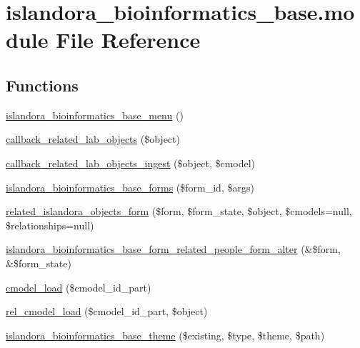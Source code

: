 \hypertarget{islandora__bioinformatics__base_8module}{\section{islandora\+\_\+bioinformatics\+\_\+base.\+module File Reference}
\label{islandora__bioinformatics__base_8module}
}
\subsection*{Functions}
\begin{DoxyCompactItemize}
\item 
\hyperlink{islandora__bioinformatics__base_8module_a34856467f23719cd8eaf851f85ccf7e8}{islandora\+\_\+bioinformatics\+\_\+base\+\_\+menu} ()
\item 
\hyperlink{islandora__bioinformatics__base_8module_a68c82f4c7760c83fb600e25c7d5a23a3}{callback\+\_\+related\+\_\+lab\+\_\+objects} (\$object)
\item 
\hyperlink{islandora__bioinformatics__base_8module_a6c31991c3bd91b6c9c008c69b8fe7f87}{callback\+\_\+related\+\_\+lab\+\_\+objects\+\_\+ingest} (\$object, \$cmodel)
\item 
\hyperlink{islandora__bioinformatics__base_8module_a2e95f32f792ce2fcd79c32895fcdbe43}{islandora\+\_\+bioinformatics\+\_\+base\+\_\+forms} (\$form\+\_\+id, \$args)
\item 
\hyperlink{islandora__bioinformatics__base_8module_a746c0835872899ef0101a8a047c8c505}{related\+\_\+islandora\+\_\+objects\+\_\+form} (\$form, \$form\+\_\+state, \$object, \$cmodels=null, \$relationships=null)
\item 
\hyperlink{islandora__bioinformatics__base_8module_a833d478f4f75aec1a655731d56a9524d}{islandora\+\_\+bioinformatics\+\_\+base\+\_\+form\+\_\+related\+\_\+people\+\_\+form\+\_\+alter} (\&\$form, \&\$form\+\_\+state)
\item 
\hyperlink{islandora__bioinformatics__base_8module_a1f0c9c90de4c35b92c19c63a7cbe74b4}{cmodel\+\_\+load} (\$cmodel\+\_\+id\+\_\+part)
\item 
\hyperlink{islandora__bioinformatics__base_8module_abaa5d1481d1ed7e3ca134bb436b0c325}{rel\+\_\+cmodel\+\_\+load} (\$cmodel\+\_\+id\+\_\+part, \$object)
\item 
\hyperlink{islandora__bioinformatics__base_8module_a76e704c8060620f768f46bd4bacb05e0}{islandora\+\_\+bioinformatics\+\_\+base\+\_\+theme} (\$existing, \$type, \$theme, \$path)

\end{DoxyCompactItemize}
